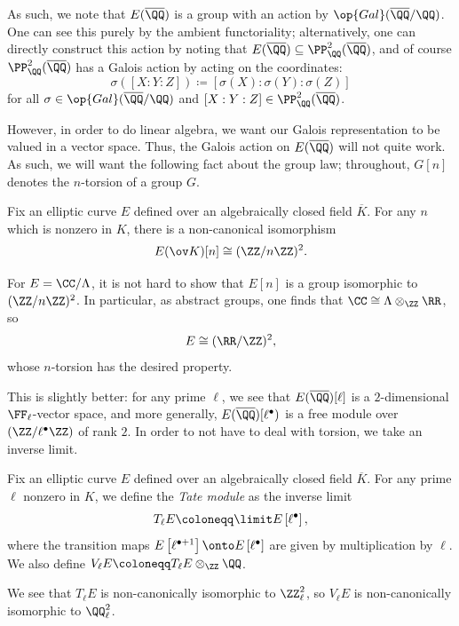 \documentclass{article}
\begin{document}
As such, we note that $E(\overline\QQ)$ is a group with an action by $\op{Gal}(\overline\QQ/\QQ)$. One can see this purely by the ambient functoriality; alternatively, one can directly construct this action by noting that $E(\overline\QQ)\subseteq\PP^2_\QQ(\overline\QQ)$, and of course $\PP^2_\QQ(\overline\QQ)$ has a Galois action by acting on the coordinates:
\[\sigma([X:Y:Z])\coloneqq[\sigma(X):\sigma(Y):\sigma(Z)]\]
for all $\sigma\in\op{Gal}(\overline\QQ/\QQ)$ and $[X:Y:Z]\in\PP^2_\QQ(\overline\QQ)$.

However, in order to do linear algebra, we want our Galois representation to be valued in a vector space. Thus, the Galois action on $E(\overline\QQ)$ will not quite work. As such, we will want the following fact about the group law; throughout, $G[n]$ denotes the $n$-torsion of a group $G$.
\begin{proposition} \label{prop:torsion-of-ec}
	Fix an elliptic curve $E$ defined over an algebraically closed field $\overline K$. For any $n$ which is nonzero in $K$, there is a non-canonical isomorphism
	\[E(\ov K)[n]\cong(\ZZ/n\ZZ)^2.\]
\end{proposition}
\begin{example}
	For $E=\CC/\Lambda$, it is not hard to show that $E[n]$ is a group isomorphic to $(\ZZ/n\ZZ)^2$. In particular, as abstract groups, one finds that $\CC\cong\Lambda\otimes_\ZZ\RR$, so
	\[E\cong(\RR/\ZZ)^2,\]
	whose $n$-torsion has the desired property.
\end{example}
This is slightly better: for any prime $\ell$, we see that $E(\overline\QQ)[\ell]$ is a $2$-dimensional $\FF_\ell$-vector space, and more generally, $E(\overline\QQ)[\ell^\bullet)$ is a free module over $(\ZZ/\ell^\bullet\ZZ)$ of rank $2$. In order to not have to deal with torsion, we take an inverse limit.
\begin{definition}
	Fix an elliptic curve $E$ defined over an algebraically closed field $\overline K$. For any prime $\ell$ nonzero in $K$, we define the \textit{Tate module} as the inverse limit
	\[T_\ell E\coloneqq\limit E\left[\ell^\bullet\right],\]
	where the transition maps $E\left[\ell^{\bullet+1}\right]\onto E\left[\ell^\bullet\right]$ are given by multiplication by $\ell$. We also define $V_\ell E\coloneqq T_\ell E\otimes_\ZZ\QQ$.
\end{definition}
\begin{remark}
	We see that $T_\ell E$ is non-canonically isomorphic to $\ZZ_\ell^2$, so $V_\ell E$ is non-canonically isomorphic to $\QQ_\ell^2$.
\end{remark}
\end{document}
